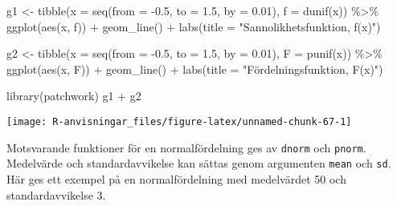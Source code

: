\documentclass[
]{book}
\newenvironment{Shaded}{\begin{snugshade}}{\end{snugshade}}
\newcommand{\AttributeTok}[1]{\textcolor[rgb]{0.77,0.63,0.00}{#1}}
\newcommand{\FloatTok}[1]{\textcolor[rgb]{0.00,0.00,0.81}{#1}}
\newcommand{\FunctionTok}[1]{\textcolor[rgb]{0.00,0.00,0.00}{#1}}
\newcommand{\NormalTok}[1]{#1}
\newcommand{\OtherTok}[1]{\textcolor[rgb]{0.56,0.35,0.01}{#1}}
\newcommand{\SpecialCharTok}[1]{\textcolor[rgb]{0.00,0.00,0.00}{#1}}
\newcommand{\StringTok}[1]{\textcolor[rgb]{0.31,0.60,0.02}{#1}}
\theoremstyle{definition}
\theoremstyle{definition}
\theoremstyle{definition}
\theoremstyle{definition}
\theoremstyle{remark}
\begin{document}
\begin{Shaded}
\begin{Highlighting}[]
\NormalTok{g1 }\OtherTok{\textless{}{-}} \FunctionTok{tibble}\NormalTok{(}\AttributeTok{x =} \FunctionTok{seq}\NormalTok{(}\AttributeTok{from =} \SpecialCharTok{{-}}\FloatTok{0.5}\NormalTok{, }\AttributeTok{to =} \FloatTok{1.5}\NormalTok{, }\AttributeTok{by =} \FloatTok{0.01}\NormalTok{),}
             \AttributeTok{f =} \FunctionTok{dunif}\NormalTok{(x)) }\SpecialCharTok{\%\textgreater{}\%} 
  \FunctionTok{ggplot}\NormalTok{(}\FunctionTok{aes}\NormalTok{(x, f)) }\SpecialCharTok{+} 
  \FunctionTok{geom\_line}\NormalTok{() }\SpecialCharTok{+}
  \FunctionTok{labs}\NormalTok{(}\AttributeTok{title =} \StringTok{"Sannolikhetsfunktion, f(x)"}\NormalTok{)}

\NormalTok{g2 }\OtherTok{\textless{}{-}} \FunctionTok{tibble}\NormalTok{(}\AttributeTok{x =} \FunctionTok{seq}\NormalTok{(}\AttributeTok{from =} \SpecialCharTok{{-}}\FloatTok{0.5}\NormalTok{, }\AttributeTok{to =} \FloatTok{1.5}\NormalTok{, }\AttributeTok{by =} \FloatTok{0.01}\NormalTok{),}
             \AttributeTok{F =} \FunctionTok{punif}\NormalTok{(x)) }\SpecialCharTok{\%\textgreater{}\%} 
  \FunctionTok{ggplot}\NormalTok{(}\FunctionTok{aes}\NormalTok{(x, F)) }\SpecialCharTok{+} 
  \FunctionTok{geom\_line}\NormalTok{() }\SpecialCharTok{+}
  \FunctionTok{labs}\NormalTok{(}\AttributeTok{title =} \StringTok{"Fördelningsfunktion, F(x)"}\NormalTok{)}

\FunctionTok{library}\NormalTok{(patchwork)}
\NormalTok{g1 }\SpecialCharTok{+}\NormalTok{ g2}
\end{Highlighting}
\end{Shaded}

\begin{center}\texttt{[image: R-anvisningar\_files/figure-latex/unnamed-chunk-67-1]} \end{center}

Motsvarande funktioner för en normalfördelning ges av \texttt{dnorm} och \texttt{pnorm}. Medelvärde och standardavvikelse kan sättas genom argumenten \texttt{mean} och \texttt{sd}. Här ges ett exempel på en normalfördelning med medelvärdet 50 och standardavvikelse 3.
\end{document}
